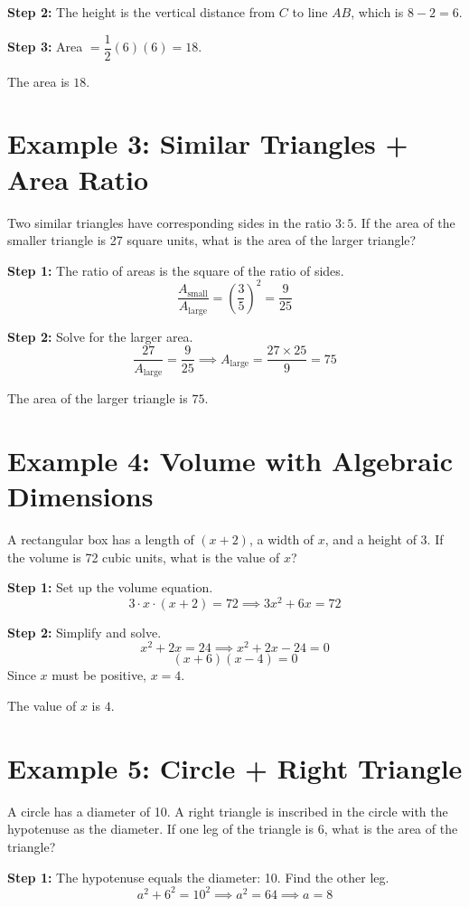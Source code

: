 \documentclass[14pt]{extarticle}
\begin{document}
\textbf{Step 2:} The height is the vertical distance from \(C\) to line \(AB\), which is \(8 - 2 = 6\).

\textbf{Step 3:} Area \(= \dfrac{1}{2}(6)(6) = 18\).

The area is \(\boxed{18}\).

\section*{Example 3: Similar Triangles + Area Ratio}

Two similar triangles have corresponding sides in the ratio \(3:5\). If the area of the smaller triangle is 27 square units, what is the area of the larger triangle?

\textbf{Step 1:} The ratio of areas is the square of the ratio of sides.
\[
\frac{A_{\text{small}}}{A_{\text{large}}} = \left(\frac{3}{5}\right)^2 = \frac{9}{25}
\]

\textbf{Step 2:} Solve for the larger area.
\[
\frac{27}{A_{\text{large}}} = \frac{9}{25} \implies A_{\text{large}} = \frac{27 \times 25}{9} = 75
\]

The area of the larger triangle is \(\boxed{75}\).

\section*{Example 4: Volume with Algebraic Dimensions}

A rectangular box has a length of \((x + 2)\), a width of \(x\), and a height of 3. If the volume is 72 cubic units, what is the value of \(x\)?

\textbf{Step 1:} Set up the volume equation.
\[
3 \cdot x \cdot (x + 2) = 72 \implies 3x^2 + 6x = 72
\]

\textbf{Step 2:} Simplify and solve.
\[
x^2 + 2x = 24 \implies x^2 + 2x - 24 = 0
\]
\[
(x + 6)(x - 4) = 0
\]
Since \(x\) must be positive, \(x = 4\).

The value of \(x\) is \(\boxed{4}\).

\section*{Example 5: Circle + Right Triangle}

A circle has a diameter of 10. A right triangle is inscribed in the circle with the hypotenuse as the diameter. If one leg of the triangle is 6, what is the area of the triangle?

\textbf{Step 1:} The hypotenuse equals the diameter: 10. Find the other leg.
\[
a^2 + 6^2 = 10^2 \implies a^2 = 64 \implies a = 8
\]
\end{document}
